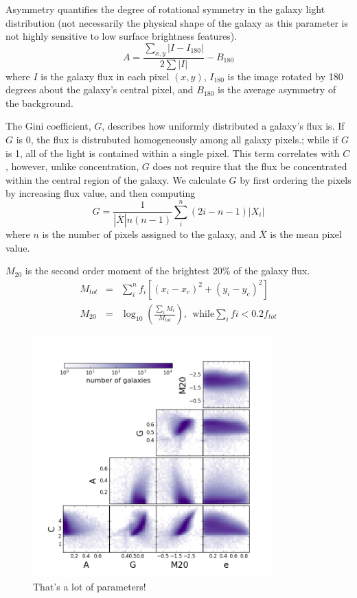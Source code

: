 \documentclass[twocolumn]{aastex6}
\newcommand{\M}[1]{$M_{#1}$}
\begin{document}
Asymmetry quantifies the degree of rotational symmetry in the galaxy light distribution (not necessarily the physical shape of the galaxy as this parameter is not highly sensitive to low surface brightness features).  
\begin{equation}
A = \frac{\sum_{x,y} |I - I_{180}|}{ 2\sum|I|} - B_{180}
\end{equation}
where $I$ is the galaxy flux in each pixel $(x, y)$, $I_{180}$ is the image rotated by 180 degrees about the galaxy's central pixel, and $B_{180}$ is the average asymmetry of the background. 

The Gini coefficient, $G$, describes how uniformly distributed a galaxy's flux is.  If $G$ is 0, the flux is distrubuted homogeneously among all galaxy pixels.; while if $G$ is 1,  all of the light is contained within a single pixel. This term correlates with $C$, however, unlike concentration, $G$ does not require that the flux be concentrated within the central region of the galaxy.  We calculate $G$ by first ordering the pixels by increasing flux value, and then computing
\begin{equation}
G = \frac{1}{|\bar X|n(n-1)}\sum_i^n(2i-n-1)|X_i|
\end{equation}
where $n$ is the number of pixels assigned to the galaxy, and $\bar X$ is the mean pixel value. 

\M{20} is the second order moment of the brightest 20\% of the galaxy flux. 
\begin{eqnarray}
 M_{tot} & = & \sum_i^nf_i[(x_i-x_c)^2 + (y_i-y_c)^2]  \\
 M_{20} & = & \log_{10} (\frac{\sum_iM_i}{M_{tot}}), ~~\textrm{while} \sum_ifi < 0.2f_{tot}
\end{eqnarray}


\begin{figure}[t!]
\includegraphics[width=3.65in]{figures/morph_params_entire_GZ2_sample.png}
\caption{That's a lot of parameters! \label{fig: machine classified}}
\end{figure}
\end{document}
